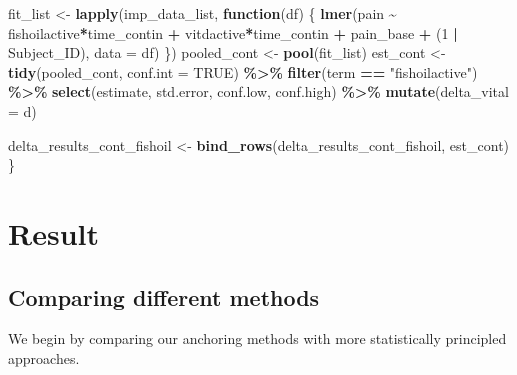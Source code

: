 \documentclass{article}
\newenvironment{Shaded}{\begin{snugshade}}{\end{snugshade}}
\newcommand{\AttributeTok}[1]{\textcolor[rgb]{0.13,0.29,0.53}{#1}}
\newcommand{\ConstantTok}[1]{\textcolor[rgb]{0.56,0.35,0.01}{#1}}
\newcommand{\ControlFlowTok}[1]{\textcolor[rgb]{0.13,0.29,0.53}{\textbf{#1}}}
\newcommand{\DecValTok}[1]{\textcolor[rgb]{0.00,0.00,0.81}{#1}}
\newcommand{\FunctionTok}[1]{\textcolor[rgb]{0.13,0.29,0.53}{\textbf{#1}}}
\newcommand{\NormalTok}[1]{#1}
\newcommand{\OtherTok}[1]{\textcolor[rgb]{0.56,0.35,0.01}{#1}}
\newcommand{\SpecialCharTok}[1]{\textcolor[rgb]{0.81,0.36,0.00}{\textbf{#1}}}
\newcommand{\StringTok}[1]{\textcolor[rgb]{0.31,0.60,0.02}{#1}}
\begin{document}
\begin{Shaded}
\begin{Highlighting}[]
\NormalTok{  fit\_list }\OtherTok{\textless{}{-}} \FunctionTok{lapply}\NormalTok{(imp\_data\_list, }\ControlFlowTok{function}\NormalTok{(df) \{}
    \FunctionTok{lmer}\NormalTok{(pain }\SpecialCharTok{\textasciitilde{}}\NormalTok{ fishoilactive}\SpecialCharTok{*}\NormalTok{time\_contin }\SpecialCharTok{+}\NormalTok{ vitdactive}\SpecialCharTok{*}\NormalTok{time\_contin }\SpecialCharTok{+}\NormalTok{ pain\_base }\SpecialCharTok{+} 
\NormalTok{           (}\DecValTok{1} \SpecialCharTok{|}\NormalTok{ Subject\_ID), }\AttributeTok{data =}\NormalTok{ df)}
\NormalTok{  \})}
\NormalTok{  pooled\_cont }\OtherTok{\textless{}{-}} \FunctionTok{pool}\NormalTok{(fit\_list)}
\NormalTok{  est\_cont }\OtherTok{\textless{}{-}} \FunctionTok{tidy}\NormalTok{(pooled\_cont, }\AttributeTok{conf.int =} \ConstantTok{TRUE}\NormalTok{) }\SpecialCharTok{\%\textgreater{}\%}
    \FunctionTok{filter}\NormalTok{(term }\SpecialCharTok{==} \StringTok{"fishoilactive"}\NormalTok{) }\SpecialCharTok{\%\textgreater{}\%}
    \FunctionTok{select}\NormalTok{(estimate, std.error, conf.low, conf.high) }\SpecialCharTok{\%\textgreater{}\%}
    \FunctionTok{mutate}\NormalTok{(}\AttributeTok{delta\_vital =}\NormalTok{ d)}
  
\NormalTok{  delta\_results\_cont\_fishoil }\OtherTok{\textless{}{-}} \FunctionTok{bind\_rows}\NormalTok{(delta\_results\_cont\_fishoil, est\_cont)}
\NormalTok{\}}
\end{Highlighting}
\end{Shaded}

\section{Result}\label{result}

\subsection{Comparing different
methods}\label{comparing-different-methods}

We begin by comparing our anchoring methods with more statistically
principled approaches.
\end{document}
